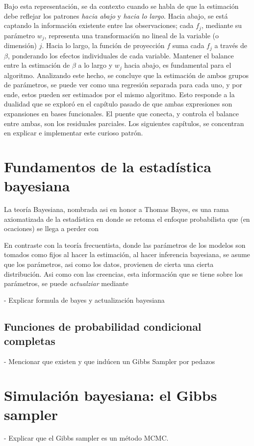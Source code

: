 \documentclass[../Main/Main.tex]{subfiles}
\begin{document}
Bajo esta representación, se da contexto cuando se habla de que la estimación debe reflejar los patrones \textit{hacia abajo} y \textit{hacia lo largo}. Hacia abajo, se está captando la información existente entre las observaciones;  cada $f_j$, mediante su parámetro $w_j$, representa una transformación no lineal de la variable (o dimensión) $j$. Hacia lo largo, la función de proyección $f$ suma cada $f_j$ a través de $\beta$, ponderando los efectos individuales de cada variable. Mantener el balance entre la estimación de $\beta$ a lo largo y $w_j$ hacia abajo, es fundamental para el algoritmo. Analizando este hecho, se concluye que la estimación de ambos grupos de parámetros, se puede ver como una regresión separada para cada uno, y por ende, estos pueden ser estimados por el mismo algoritmo. Esto responde a la dualidad que se exploró en el capítulo pasado de que ambas expresiones son expansiones en bases funcionales. El puente que conecta, y controla el balance entre ambas, son los residuales parciales. Los siguientes capítulos, se concentran en explicar e implementar este curioso patrón. 

\section{Fundamentos de la estadística bayesiana}
La teoría Bayesiana, nombrada asi en honor a Thomas Bayes, es una rama axiomatizada de la estadística en donde se retoma el enfoque probabilista que (en ocaciones) se llega a perder con  

En contraste con la teoría frecuentista, donde las parámetros de los modelos son tomados como fijos al hacer la estimación, al hacer inferencia bayesiana, se asume que los parámetros, asi como los datos, provienen de cierta una cierta distribución. Asi como con las creencias, esta información que se tiene sobre los parámetros, se puede \textit{actualziar} mediante 

- Explicar formula de bayes y actualización bayesiana

\subsection{Funciones de probabilidad condicional completas}
- Mencionar que existen y que indúcen un Gibbs Sampler por pedazos

\section{Simulación bayesiana: el Gibbs sampler}
- Explicar que el Gibbs sampler es un método MCMC.
\end{document}
